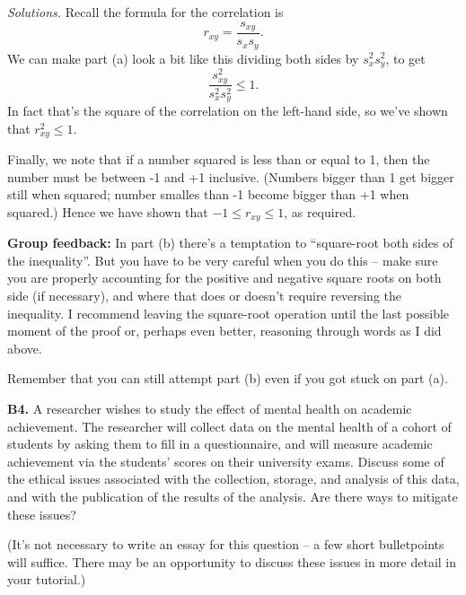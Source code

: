 \documentclass[
  a4paper,
]{book}
\theoremstyle{definition}
\theoremstyle{definition}
\theoremstyle{definition}
\theoremstyle{definition}
\theoremstyle{remark}
\begin{document}
\begin{myanswers}
\emph{Solutions.}
Recall the formula for the correlation is
\[ r_{xy} = \frac{s_{xy}}{s_xs_y} . \]
We can make part (a) look a bit like this dividing both sides by \(s_x^2 s_y^2\), to get
\[\frac{s_{xy}^2}{s_x^2 s_y^2} \leq 1.   \]
In fact that's the square of the correlation on the left-hand side, so we've shown that \(r_{xy}^2 \leq 1\).

Finally, we note that if a number squared is less than or equal to 1, then the number must be between -1 and +1 inclusive. (Numbers bigger than 1 get bigger still when squared; number smalles than -1 become bigger than +1 when squared.) Hence we have shown that \(-1 \leq r_{xy} \leq 1\), as required.

\textbf{Group feedback:} In part (b) there's a temptation to ``square-root both sides of the inequality''. But you have to be very careful when you do this -- make sure you are properly accounting for the positive and negative square roots on both side (if necessary), and where that does or doesn't require reversing the inequality. I recommend leaving the square-root operation until the last possible moment of the proof or, perhaps even better, reasoning through words as I did above.

Remember that you can still attempt part (b) even if you got stuck on part (a).

\end{myanswers}

\textbf{B4.} A researcher wishes to study the effect of mental health on academic achievement. The researcher will collect data on the mental health of a cohort of students by asking them to fill in a questionnaire, and will measure academic achievement via the students' scores on their university exams. Discuss some of the ethical issues associated with the collection, storage, and analysis of this data, and with the publication of the results of the analysis. Are there ways to mitigate these issues?

(It's not necessary to write an essay for this question -- a few short bulletpoints will suffice. There may be an opportunity to discuss these issues in more detail in your tutorial.)
\end{document}
